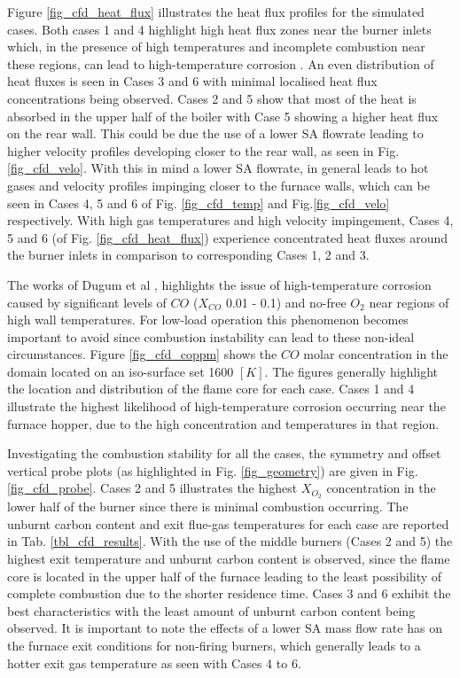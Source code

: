 \documentclass[11pt,cleanfoot]{asme2ej}
\begin{document}
Figure \ref{fig_cfd_heat_flux} illustrates the heat flux profiles for the simulated cases. Both cases 1 and 4 highlight high heat flux zones near the burner inlets which, in the presence of high temperatures and incomplete combustion near these regions, can lead to high-temperature corrosion \cite{ugum2019}. An even distribution of heat fluxes is seen in Cases 3 and 6 with minimal localised heat flux concentrations being observed. Cases 2 and 5 show that most of the heat is absorbed in the upper half of the boiler with Case 5 showing a higher heat flux on the rear wall. This could be due the use of a lower SA flowrate leading to higher velocity profiles developing closer to the rear wall, as seen in Fig. \ref{fig_cfd_velo}. With this in mind a lower SA flowrate, in general leads to hot gases and velocity profiles impinging closer to the furnace walls, which can be seen in Cases 4, 5 and 6 of Fig. \ref{fig_cfd_temp} and Fig.\ref{fig_cfd_velo} respectively. With high gas temperatures and high velocity impingement, Cases 4, 5 and 6 (of Fig. \ref{fig_cfd_heat_flux}) experience concentrated heat fluxes around the burner inlets in comparison to corresponding Cases 1, 2 and 3.

The works of Dugum et al \cite{ugum2019}, highlights the issue of high-temperature corrosion caused by significant levels of $CO$ ($X_{CO}$ 0.01 - 0.1) and no-free $O_2$ near regions of high wall temperatures. For low-load operation this phenomenon becomes important to avoid since combustion instability can lead to these non-ideal circumstances. Figure \ref{fig_cfd_coppm} shows the $CO$ molar concentration in the domain located on an iso-surface set 1600 $[K]$. The figures generally highlight the location and distribution of the flame core for each case. Cases 1 and 4 illustrate the highest likelihood of high-temperature corrosion occurring near the furnace hopper, due to the high concentration and temperatures in that region.

Investigating the combustion stability for all the cases, the symmetry and offset vertical probe plots (as highlighted in Fig. \ref{fig_geometry}) are given in Fig. \ref{fig_cfd_probe}. Cases 2 and 5 illustrates the highest $X_{O_{2}}$ concentration in the lower half of the burner since there is minimal combustion occurring. The unburnt carbon content and exit flue-gas temperatures for each case are reported in Tab. \ref{tbl_cfd_results}. With the use of the middle burners (Cases 2 and 5) the highest exit temperature and unburnt carbon content is observed, since the flame core is located in the upper half of the furnace leading to the least possibility of complete combustion due to the shorter residence time. Cases 3 and 6 exhibit the best characteristics with the least amount of unburnt carbon content being observed. It is important to note the effects of a lower SA mass flow rate has on the furnace exit conditions for non-firing burners, which generally leads to a hotter exit gas temperature as seen with Cases 4 to 6. 
\end{document}
